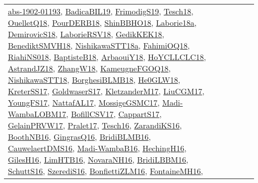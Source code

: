 {\begin{longtable}{lp{3cm}>{\raggedright}p{6cm}>{\raggedright}p{6cm}p{8cm}}
\href{articles/abs-1902-01193.pdf}{abs-1902-01193}\cite{abs-1902-01193}, \href{papers/BadicaBIL19.pdf}{BadicaBIL19}\cite{BadicaBIL19}, \href{papers/FrimodigS19.pdf}{FrimodigS19}\cite{FrimodigS19}, \href{papers/Tesch18.pdf}{Tesch18}\cite{Tesch18}, \href{papers/OuelletQ18.pdf}{OuelletQ18}\cite{OuelletQ18}, \href{articles/PourDERB18.pdf}{PourDERB18}\cite{PourDERB18}, \href{articles/ShinBBHO18.pdf}{ShinBBHO18}\cite{ShinBBHO18}, \href{papers/Laborie18a.pdf}{Laborie18a}\cite{Laborie18a}, \href{papers/DemirovicS18.pdf}{DemirovicS18}\cite{DemirovicS18}, \href{articles/LaborieRSV18.pdf}{LaborieRSV18}\cite{LaborieRSV18}, \href{articles/GedikKEK18.pdf}{GedikKEK18}\cite{GedikKEK18}, \href{papers/BenediktSMVH18.pdf}{BenediktSMVH18}\cite{BenediktSMVH18}, \href{papers/NishikawaSTT18a.pdf}{NishikawaSTT18a}\cite{NishikawaSTT18a}, \href{articles/FahimiOQ18.pdf}{FahimiOQ18}\cite{FahimiOQ18}, \href{papers/RiahiNS018.pdf}{RiahiNS018}\cite{RiahiNS018}, \href{articles/BaptisteB18.pdf}{BaptisteB18}\cite{BaptisteB18}, \href{papers/ArbaouiY18.pdf}{ArbaouiY18}\cite{ArbaouiY18}, \href{papers/HoYCLLCLC18.pdf}{HoYCLLCLC18}\cite{HoYCLLCLC18}, \href{papers/AstrandJZ18.pdf}{AstrandJZ18}\cite{AstrandJZ18}, \href{articles/ZhangW18.pdf}{ZhangW18}\cite{ZhangW18}, \href{papers/KameugneFGOQ18.pdf}{KameugneFGOQ18}\cite{KameugneFGOQ18}, \href{papers/NishikawaSTT18.pdf}{NishikawaSTT18}\cite{NishikawaSTT18}, \href{articles/BorghesiBLMB18.pdf}{BorghesiBLMB18}\cite{BorghesiBLMB18}, \href{papers/He0GLW18.pdf}{He0GLW18}\cite{He0GLW18}, \href{articles/KreterSS17.pdf}{KreterSS17}\cite{KreterSS17}, \href{papers/GoldwaserS17.pdf}{GoldwaserS17}\cite{GoldwaserS17}, \href{papers/KletzanderM17.pdf}{KletzanderM17}\cite{KletzanderM17}, \href{papers/LiuCGM17.pdf}{LiuCGM17}\cite{LiuCGM17}, \href{papers/YoungFS17.pdf}{YoungFS17}\cite{YoungFS17}, \href{articles/NattafAL17.pdf}{NattafAL17}\cite{NattafAL17}, \href{papers/MossigeGSMC17.pdf}{MossigeGSMC17}\cite{MossigeGSMC17}, \href{papers/Madi-WambaLOBM17.pdf}{Madi-WambaLOBM17}\cite{Madi-WambaLOBM17}, \href{papers/BofillCSV17.pdf}{BofillCSV17}\cite{BofillCSV17}, \href{papers/CappartS17.pdf}{CappartS17}\cite{CappartS17}, \href{papers/GelainPRVW17.pdf}{GelainPRVW17}\cite{GelainPRVW17}, \href{papers/Pralet17.pdf}{Pralet17}\cite{Pralet17}, \href{papers/Tesch16.pdf}{Tesch16}\cite{Tesch16}, \href{articles/ZarandiKS16.pdf}{ZarandiKS16}\cite{ZarandiKS16}, \href{papers/BoothNB16.pdf}{BoothNB16}\cite{BoothNB16}, \href{papers/GingrasQ16.pdf}{GingrasQ16}\cite{GingrasQ16}, \href{articles/BridiBLMB16.pdf}{BridiBLMB16}\cite{BridiBLMB16}, \href{papers/CauwelaertDMS16.pdf}{CauwelaertDMS16}\cite{CauwelaertDMS16}, \href{papers/Madi-WambaB16.pdf}{Madi-WambaB16}\cite{Madi-WambaB16}, \href{papers/HechingH16.pdf}{HechingH16}\cite{HechingH16}, \href{papers/GilesH16.pdf}{GilesH16}\cite{GilesH16}, \href{papers/LimHTB16.pdf}{LimHTB16}\cite{LimHTB16}, \href{articles/NovaraNH16.pdf}{NovaraNH16}\cite{NovaraNH16}, \href{papers/BridiLBBM16.pdf}{BridiLBBM16}\cite{BridiLBBM16}, \href{papers/SchuttS16.pdf}{SchuttS16}\cite{SchuttS16}, \href{papers/SzerediS16.pdf}{SzerediS16}\cite{SzerediS16}, \href{papers/BonfiettiZLM16.pdf}{BonfiettiZLM16}\cite{BonfiettiZLM16}, \href{papers/FontaineMH16.pdf}{FontaineMH16}\cite{FontaineMH16}, 
\end{longtable}}
